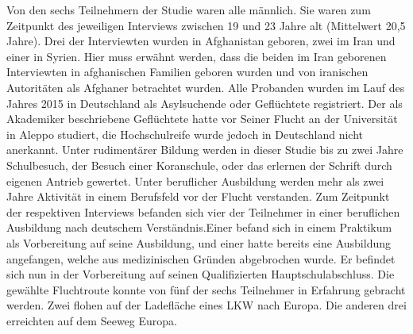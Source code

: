 Von den sechs Teilnehmern der Studie waren alle männlich. Sie waren zum Zeitpunkt des jeweiligen Interviews zwischen 19 und 23 Jahre alt (Mittelwert 20,5 Jahre). Drei der Interviewten wurden in Afghanistan geboren, zwei im Iran und einer in Syrien. \newline 
Hier muss erwähnt werden, dass die beiden im Iran geborenen Interviewten in afghanischen Familien geboren wurden und von iranischen Autoritäten als Afghaner betrachtet wurden.\newline
Alle Probanden wurden im Lauf des Jahres 2015 in Deutschland als Asylsuchende oder Geflüchtete registriert. Der als Akademiker beschriebene Geflüchtete hatte vor Seiner Flucht an der Universität in Aleppo studiert, die Hochschulreife wurde jedoch in Deutschland nicht anerkannt.\newline
Unter rudimentärer Bildung werden in dieser Studie bis zu zwei Jahre Schulbesuch, der Besuch einer Koranschule, oder das erlernen der Schrift durch eigenen Antrieb gewertet.\newline
Unter beruflicher Ausbildung werden mehr als zwei Jahre Aktivität in einem Berufsfeld vor der Flucht verstanden.\newline
Zum Zeitpunkt der respektiven Interviews befanden sich vier der Teilnehmer in einer beruflichen Ausbildung nach deutschem Verständnis.\newline Einer befand sich in einem Praktikum als Vorbereitung auf seine Ausbildung, und einer hatte bereits eine Ausbildung angefangen, welche aus medizinischen Gründen abgebrochen wurde. Er befindet sich nun in der Vorbereitung auf seinen Qualifizierten Hauptschulabschluss.\newline
Die gewählte Fluchtroute konnte von fünf der sechs Teilnehmer in Erfahrung gebracht werden. Zwei flohen auf der Ladefläche eines LKW nach Europa. Die anderen drei erreichten auf dem Seeweg Europa.